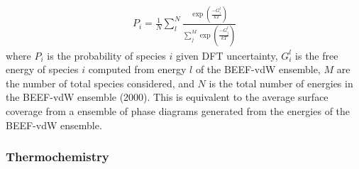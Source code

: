 \documentclass[journal=ascecg,manuscript=article,articletitle=true]{achemso}
\begin{document}
\begin{align}
	P_i = \frac{1}{N}\sum_{l} ^{N} \frac{\exp(\frac{-G_i^l}{kT})}{\sum_{j} ^{M}\exp(\frac{-G^l_j}{kT})}
	\label{eq:prob}
\end{align}
where $P_i$ is the probability of species $i$ given DFT uncertainty, $G_i^l$ is the free energy of species $i$ computed from energy $l$ of the BEEF-vdW ensemble, $M$ are the number of total species considered, and $N$ is the total number of energies in the BEEF-vdW ensemble (2000). This is equivalent to the average surface coverage from a ensemble of phase diagrams generated from the energies of the BEEF-vdW ensemble. 

\subsubsection{Thermochemistry}
\end{document}
